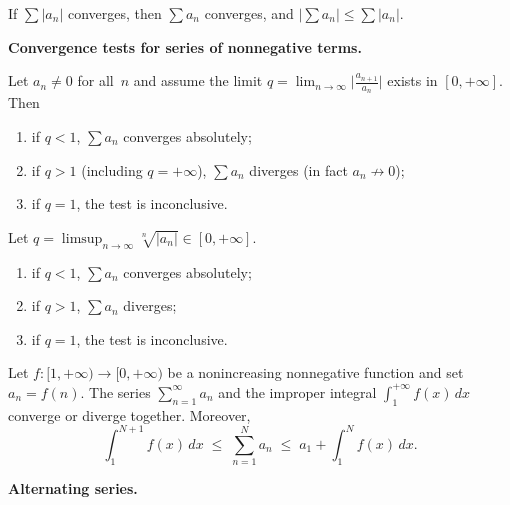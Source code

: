 \begin{theorem}
\label{thm:abs-implies-conv}
If $\sum |a_n|$ converges, then $\sum a_n$ converges, and
$\bigl|\sum a_n\bigr| \le \sum |a_n|$.
\end{theorem}

\medskip

\noindent\textbf{Convergence tests for series of nonnegative terms.}

\begin{theorem}
\label{thm:dalembert}
Let $a_n \neq 0$ for all~$n$ and assume the limit
$q = \lim_{n \to \infty} \bigl|\tfrac{a_{n+1}}{a_n}\bigr|$ exists in
$[0, +\infty]$. Then
\begin{enumerate}[label=(\alph*)]
  \item if $q < 1$, $\sum a_n$ converges absolutely;
  \item if $q > 1$ (including $q = +\infty$), $\sum a_n$ diverges
        (in fact $a_n \not\to 0$);
  \item if $q = 1$, the test is inconclusive.
\end{enumerate}
\end{theorem}

\begin{theorem}
\label{thm:cauchy-root}
Let $q = \limsup_{n \to \infty} \sqrt[n]{|a_n|} \in [0, +\infty]$.
\begin{enumerate}[label=(\alph*)]
  \item if $q < 1$, $\sum a_n$ converges absolutely;
  \item if $q > 1$, $\sum a_n$ diverges;
  \item if $q = 1$, the test is inconclusive.
\end{enumerate}
\end{theorem}

\begin{theorem}
\label{thm:integral-test}
Let $f \colon [1, +\infty) \to [0, +\infty)$ be a nonincreasing
nonnegative function and set $a_n = f(n)$. The series
$\sum_{n=1}^{\infty} a_n$ and the improper integral
$\int_1^{+\infty} f(x)\, dx$ converge or diverge together. Moreover,
\[
  \int_{1}^{N+1} f(x)\, dx \;\le\; \sum_{n=1}^{N} a_n \;\le\; a_1 + \int_{1}^{N} f(x)\, dx.
\]
\end{theorem}

\medskip

\noindent\textbf{Alternating series.}

